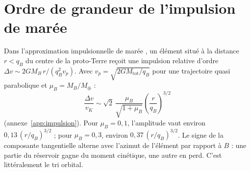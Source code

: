 \documentclass[11pt,a4paper,openany]{report}
\newcommand{\Mt}{M_{\oplus}}
\newcommand{\Mtot}{M_{\mathrm{tot}}}
\begin{document}
\section{Ordre de grandeur de l'impulsion de marée}

Dans l'approximation impulsionnelle de marée \cite{Spitzer1958,BinneyTremaine2008}, un
élément situé à la distance $r<q_B$ du centre de la proto-Terre reçoit une impulsion relative
d'ordre $\Delta v\sim2GM_B\,r/(q_B^2v_p)$. Avec $v_p=\sqrt{2G\Mtot/q_B}$ pour une trajectoire
quasi parabolique et $\mu_B=M_B/\Mt$ :
\begin{equation}
\frac{\Delta v}{v_K}\sim\sqrt2\,\frac{\mu_B}{\sqrt{1+\mu_B}}\left(\frac{r}{q_B}\right)^{3/2}
\label{eq:impulsion}
\end{equation}
(annexe~\ref{app:impulsion}). Pour $\mu_B=0{,}1$, l'amplitude vaut environ $0{,}13\,(r/q_B)^{3/2}$ ;
pour $\mu_B=0{,}3$, environ $0{,}37\,(r/q_B)^{3/2}$. Le signe de la composante tangentielle alterne
avec l'azimut de l'élément par rapport à $B$ : une partie du réservoir gagne du moment cinétique,
une autre en perd. C'est littéralement le tri orbital.
\end{document}
